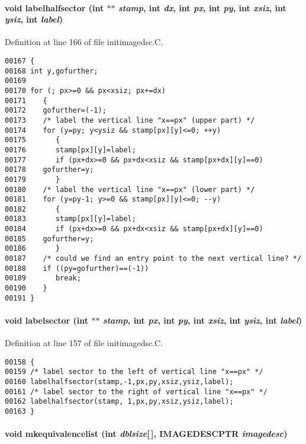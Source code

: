 \paragraph{\setlength{\rightskip}{0pt plus 5cm}void labelhalfsector (int $\ast$$\ast$ {\em stamp}, int {\em dx}, int {\em px}, int {\em py}, int {\em xsiz}, int {\em ysiz}, int {\em label})}\hfill



Definition at line 166 of file initimagedsc.C.\small\begin{verbatim}00167 {
00168 int y,gofurther;
00169 
00170 for (; px>=0 && px<xsiz; px+=dx)
00171    {
00172    gofurther=(-1);
00173    /* label the vertical line "x==px" (upper part) */
00174    for (y=py; y<ysiz && stamp[px][y]<=0; ++y)
00175       {
00176       stamp[px][y]=label;
00177       if (px+dx>=0 && px+dx<xsiz && stamp[px+dx][y]==0)
00178    gofurther=y;
00179       }
00180    /* label the vertical line "x==px" (lower part) */
00181    for (y=py-1; y>=0 && stamp[px][y]<=0; --y)
00182       {
00183       stamp[px][y]=label;
00184       if (px+dx>=0 && px+dx<xsiz && stamp[px+dx][y]==0)
00185    gofurther=y;
00186       }
00187    /* could we find an entry point to the next vertical line? */
00188    if ((py=gofurther)==(-1))
00189       break;
00190    }
00191 }
\end{verbatim}\normalsize 
\label{im.h_a13}
\paragraph{\setlength{\rightskip}{0pt plus 5cm}void labelsector (int $\ast$$\ast$ {\em stamp}, int {\em px}, int {\em py}, int {\em xsiz}, int {\em ysiz}, int {\em label})}\hfill



Definition at line 157 of file initimagedsc.C.\small\begin{verbatim}00158 {
00159 /* label sector to the left of vertical line "x==px" */
00160 labelhalfsector(stamp,-1,px,py,xsiz,ysiz,label);
00161 /* label sector to the right of vertical line "x==px" */
00162 labelhalfsector(stamp, 1,px,py,xsiz,ysiz,label);
00163 }
\end{verbatim}\normalsize 
\label{im.h_a15}
\paragraph{\setlength{\rightskip}{0pt plus 5cm}void mkequivalencelist (int {\em dblsize}[$\,$], {\bf IMAGEDESCPTR} {\em imagedesc})}\hfill



